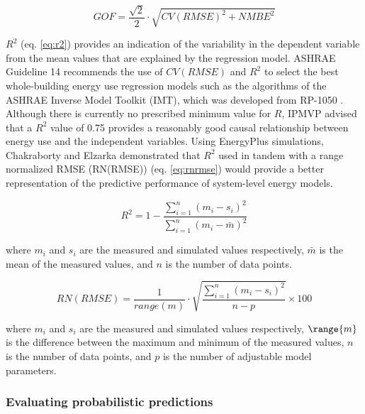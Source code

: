 \documentclass[review]{elsarticle}
\begin{document}
\begin{equation}\label{eq:gof}
GOF = \frac{\sqrt{2}}{2} \cdot \sqrt{CV(RMSE)^2 + NMBE^2}
\end{equation}

$R^2$ (eq. \ref{eq:r2}) provides an indication of the variability in the dependent variable from the mean values that are explained by the regression model. ASHRAE Guideline 14 \cite{ashrae2014guideline} recommends the use of $CV(RMSE)$ and $R^2$ to select the best whole-building energy use regression models such as the algorithms of the ASHRAE Inverse Model Toolkit (IMT), which was developed from RP-1050 \cite{kissock2003inverse, haberl2003inverse}. Although there is currently no prescribed minimum value for $R$, IPMVP \cite{evo2019uncertainty} advised that a $R^2$ value of 0.75 provides a reasonably good causal relationship between energy use and the independent variables. Using EnergyPlus simulations, Chakraborty and Elzarka \cite{chakraborty2017performance} demonstrated that $R^2$ used in tandem with a range normalized RMSE (RN(RMSE)) (eq. \ref{eq:rnrmse}) would provide a better representation of the predictive performance of system-level energy models. 

\begin{equation}\label{eq:r2}
R^2 = 1 - \frac{\sum_{i=1}^n (m_i - s_i)^2}{\sum_{i=1}^n (m_i - \bar{m})^2}
\end{equation}

\noindent where $m_i$ and $s_i$ are the measured and simulated values respectively, $\bar{m}$ is the mean of the measured values, and $n$ is the number of data points.

\begin{equation}\label{eq:rnrmse}
RN(RMSE) = \frac{1}{range(m)}\cdot \sqrt{\frac{\sum_{i=1}^n (m_i - s_i)^2}{n-p}} \times 100
\end{equation}

\noindent where $m_i$ and $s_i$ are the measured and simulated values respectively, $\range{m}$ is the difference between the maximum and minimum of the measured values, $n$ is the number of data points, and $p$ is the number of adjustable model parameters.

\subsubsection{Evaluating probabilistic predictions}
\end{document}

